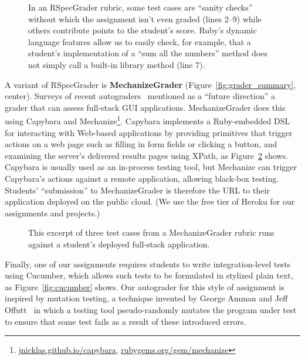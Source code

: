 \begin{figure} \centering
  
  \caption{\label{fig:rspec_grader_rubric} In an RSpecGrader rubric,
    some test cases are ``sanity checks'' without which the assignment
    isn't even graded (lines 2--9) while others contribute points to the
    student's score.
  Ruby's dynamic language features allow us to
    easily check, for example, that
a student's implementation of a ``sum all the numbers'' method does not
simply call a built-in library method (line 7).
  }
\end{figure}

A variant of RSpecGrader is \textbf{MechanizeGrader}  (Figure~\ref{fig:grader_summary}, center).
Surveys of recent
autograders~\cite{ihantola-2010-autograding-survey,douce-2005-autograding-survey}
mentioned as a ``future direction'' a grader that can assess full-stack
GUI applications.
MechanizeGrader does this using Capybara and
Mechanize\footnote{\url{jnicklas.github.io/capybara},
\url{rubygems.org/gem/mechanize}}.
Capybara implements a Ruby-embedded DSL for interacting with Web-based
applications by providing primitives that trigger actions on a web page
such as filling in form fields or clicking a button, and examining the
server's delivered results pages using XPath, as
Figure~\ref{fig:mechanize_grader_example} shows. 
Capybara is usually used as an in-process testing tool, but Mechanize
can trigger Capybara's actions against a remote application, allowing
black-box testing.
Students' ``submission'' to MechanizeGrader is therefore the URL to their
application deployed on the public 
cloud.  (We use the free tier of Heroku for our assignments and
projects.)

\begin{figure}
 \centering
  
  \caption{\label{fig:mechanize_grader_example} 
This excerpt of three test cases from a MechanizeGrader rubric runs
against a student's 
deployed full-stack application.}
\end{figure}

Finally, one of our assignments requires students to write integration-level
tests using Cucumber, which allows such tests to be formulated in
stylized plain text, as Figure~\ref{fig:cucumber} shows.
Our autograder for this
style of assignment is inspired by mutation testing, a technique invented
by George Amman and Jeff 
Offutt~\cite{ammann-offutt-sw-testing} in which a
testing tool pseudo-randomly mutates the program under test to ensure
that some test fails as a result of these introduced errors.

